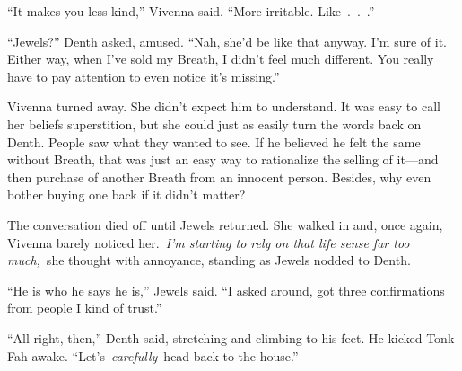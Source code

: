“It makes you less kind,” Vivenna said. “More irritable. Like~.~.~.”

“Jewels?” Denth asked, amused. “Nah, she’d be like that anyway. I’m sure of it. Either way, when I’ve sold my Breath, I didn’t feel much different. You really have to pay attention to even notice it’s missing.”

Vivenna turned away. She didn’t expect him to understand. It was easy to call her beliefs superstition, but she could just as easily turn the words back on Denth. People saw what they wanted to see. If he believed he felt the same without Breath, that was just an easy way to rationalize the selling of it—and then purchase of another Breath from an innocent person. Besides, why even bother buying one back if it didn’t matter?

The conversation died off until Jewels returned. She walked in and, once again, Vivenna barely noticed her.~\textit{I’m starting to rely on that life sense far too much,}~she thought with annoyance, standing as Jewels nodded to Denth.

“He is who he says he is,” Jewels said. “I asked around, got three confirmations from people I kind of trust.”

“All right, then,” Denth said, stretching and climbing to his feet. He kicked Tonk Fah awake. “Let’s~\textit{carefully}~head back to the house.”

